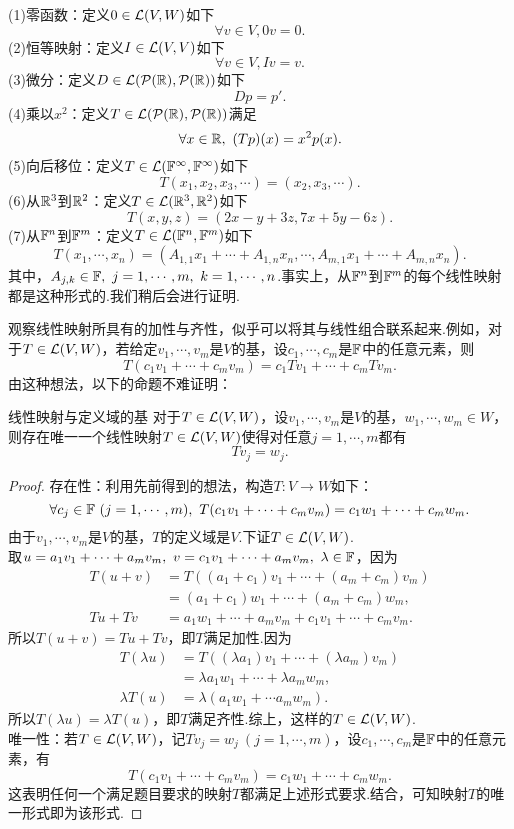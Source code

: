 \begin{example}{}
	(1)零函数：定义$0 \in \mathcal{L} (V,W)$如下$$\forall v \in V, 0v=0.$$
	(2)恒等映射：定义$I \in \mathcal{L} (V,V)$如下$$\forall v \in V, Iv=v.$$
	(3)微分：定义$D \in \mathcal{L} (\mathcal{P}(\mathbb{R}),\mathcal{P}(\mathbb{R}))$如下$$Dp=p'.$$
	(4)乘以$x^2$：定义$T \in \mathcal{L} (\mathcal{P}(\mathbb{R}),\mathcal{P}(\mathbb{R}))$满足$$\forall x \in \mathbb{R} ,~(Tp)(x)=x^2p(x).$$
	(5)向后移位：定义$T \in \mathcal{L} (\mathbb{F} ^{\infty},\mathbb{F} ^{\infty})$如下$$T(x_1,x_2,x_3, \cdots ) = (x_2,x_3, \cdots).$$
	(6)从$\mathbb{R} ^3$到$\mathbb{R} ^2$：定义$T \in \mathcal{L} (\mathbb{R} ^{3},\mathbb{R} ^{2})$如下$$T(x,y,z)=(2x-y+3z,7x+5y-6z).$$
	(7)从$\mathbb{F} ^n$到$\mathbb{F} ^m$：定义$T \in \mathcal{L} (\mathbb{F} ^{n},\mathbb{F} ^{m})$如下$$T(x_1,\cdots ,x_n) = (A_{1,1}x_1 + \cdots + A_{1,n}x_n, \cdots , A_{m,1}x_1+\cdots +A_{m,n}x_n).$$
	其中，$A_{j,k} \in \mathbb{F} ,~j=1, \cdots ,m,~ k = 1, \cdots ,n$.事实上，从$\mathbb{F} ^n$到$\mathbb{F} ^m$的每个线性映射都是这种形式的.我们稍后会进行证明.
\end{example}

观察线性映射所具有的加性与齐性，似乎可以将其与线性组合联系起来.例如，对于$T \in \mathcal{L} (V,W)$，若给定$v_1, \cdots ,v_m$是$V$的基，设$c_1, \cdots ,c_m$是$\mathbb{F}$中的任意元素，则$$T(c_1v_1 + \cdots + c_mv_m) = c_1Tv_1 + \cdots + c_mTv_m.$$
由这种想法，以下的命题不难证明：

\begin{proposition}{线性映射与定义域的基} \label{pro:xmxkykuedkyiyu}
	对于$T \in \mathcal{L} (V,W)$，设$v_1, \cdots ,v_m$是$V$的基，$w_1, \cdots ,w_m \in W$，则存在唯一一个线性映射$T \in \mathcal{L} (V,W)$使得对任意$j=1, \cdots ,m$都有$$Tv_j = w_j.$$
\end{proposition}
\begin{proof}
	存在性：利用先前得到的想法，构造$T:V \to W$如下：$$\forall c_j \in \mathbb{F}~(j=1, \cdots,m),~T(c_1v_1 + \cdots + c_mv_m) = c_1w_1 + \cdots + c_mw_m.$$
	由于$v_1, \cdots ,v_m$是$V$的基，$T$的定义域是$V$.下证$T \in \mathcal{L} (V,W)$. \\
	取$u=a_1v_1 + \cdots + a_mv_m,~v=c_1v_1 + \cdots + a_mv_m,~ \lambda \in \mathbb{F}$，因为
	\begin{align*}
		T(u+v) &= T((a_1+c_1)v_1 + \cdots + (a_m+c_m)v_m) \\
		&= (a_1+c_1)w_1 + \cdots + (a_m+c_m)w_m, \\
		Tu+Tv &= a_1w_1 + \cdots + a_mv_m + c_1v_1 + \cdots + c_mv_m.
	\end{align*}
	所以$T(u+v)=Tu+Tv$，即$T$满足加性.因为
	\begin{align*}
		T(\lambda u) &= T((\lambda a_1)v_1 + \cdots + (\lambda a_m)v_m) \\
		&= \lambda a_1 w_1 + \cdots + \lambda a_m w_m, \\
		\lambda T(u) &= \lambda (a_1w_1 + \cdots a_mw_m).
	\end{align*}
	所以$T(\lambda u)=\lambda T(u)$，即$T$满足齐性.综上，这样的$T \in \mathcal{L} (V,W)$. \\
	唯一性：若$T \in \mathcal{L} (V,W)$，记$T v_j = w_j~(j=1,\cdots ,m)$，设$c_1, \cdots ,c_m$是$\mathbb{F}$中的任意元素，有$$T(c_1v_1 + \cdots + c_mv_m) = c_1w_1 + \cdots + c_mw_m.$$
	这表明任何一个满足题目要求的映射$T$都满足上述形式要求.结合，可知映射$T$的唯一形式即为该形式.
\end{proof}

